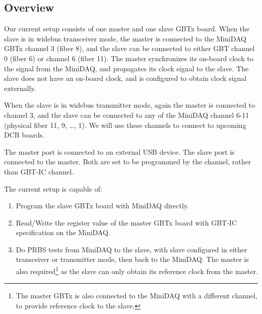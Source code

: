 \subsection{Overview}
Our current setup consists of one master and one slave GBTx board.
When the slave is in widebus transceiver mode,
the master is connected to the MiniDAQ GBTx channel 3 (fiber 8),
and the slave can be connected to either GBT channel 0 (fiber 6) or channel 6
(fiber 11).
The master synchronizes its on-board clock to the signal from the MiniDAQ,
and propagates its clock signal to the slave.
The slave does not have an on-board clock,
and is configured to obtain clock signal externally.

When the slave is in widebus transmitter mode,
again the master is connected to channel 3,
and the slave can be connected to any of the MiniDAQ channel 6-11
(physical fiber 11, 9, \ldots, 1).
We will use these channels to connect to upcoming DCB boards.

The master \itwoc port is connected to an external USB device.
The slave \itwoc port is connected to the master.
Both are set to be programmed by the \itwoc channel,
rather than GBT-IC channel.

The current setup is capable of:
\begin{enumerate}
    \item Program the slave GBTx board with MiniDAQ directly.
    \item Read/Write the register value of the master GBTx board with GBT-IC
        specification on the MiniDAQ.
    \item Do PRBS tests from MiniDAQ to the slave, with slave configured in
        either transceiver or transmitter mode, then back to the MiniDAQ.
        The master is also required\footnote{
            The master GBTx is also connected to the MiniDAQ with a different
        channel, to provide reference clock to the slave.}
        as the slave can only obtain its reference clock from the master.
\end{enumerate}
